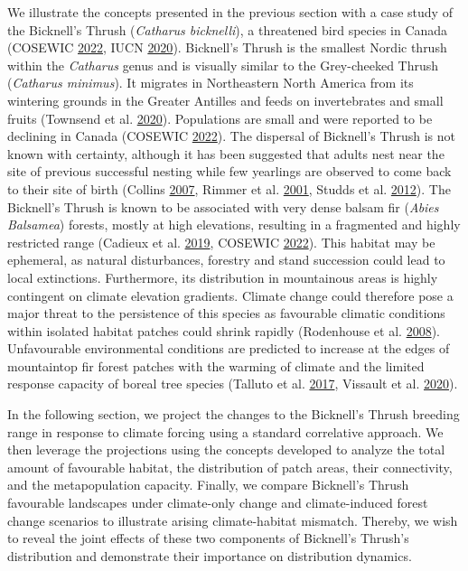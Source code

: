 \documentclass[12pt]{article}
\begin{document}
We illustrate the concepts presented in the previous section with a case
study of the Bicknell's Thrush (\emph{Catharus bicknelli}), a threatened
bird species in Canada (COSEWIC
\protect\hyperlink{ref-cosewic_cosewic_2022}{2022}, IUCN
\protect\hyperlink{ref-iucn_catharus_2020}{2020}). Bicknell's Thrush is
the smallest Nordic thrush within the \emph{Catharus} genus and is
visually similar to the Grey-cheeked Thrush (\emph{Catharus minimus}).
It migrates in Northeastern North America from its wintering grounds in
the Greater Antilles and feeds on invertebrates and small fruits
(Townsend et al.
\protect\hyperlink{ref-billerman_bicknells_2020}{2020}). Populations are
small and were reported to be declining in Canada (COSEWIC
\protect\hyperlink{ref-cosewic_cosewic_2022}{2022}). The dispersal of
Bicknell's Thrush is not known with certainty, although it has been
suggested that adults nest near the site of previous successful nesting
while few yearlings are observed to come back to their site of birth
(Collins \protect\hyperlink{ref-collins_spatial_2007}{2007}, Rimmer et
al. \protect\hyperlink{ref-rimmer_bicknells_2001}{2001}, Studds et al.
\protect\hyperlink{ref-studds_stable-hydrogen_2012}{2012}). The
Bicknell's Thrush is known to be associated with very dense balsam fir
(\emph{Abies Balsamea}) forests, mostly at high elevations, resulting in
a fragmented and highly restricted range (Cadieux et al.
\protect\hyperlink{ref-cadieux_spatially_2019}{2019}, COSEWIC
\protect\hyperlink{ref-cosewic_cosewic_2022}{2022}). This habitat may be
ephemeral, as natural disturbances, forestry and stand succession could
lead to local extinctions. Furthermore, its distribution in mountainous
areas is highly contingent on climate elevation gradients. Climate
change could therefore pose a major threat to the persistence of this
species as favourable climatic conditions within isolated habitat
patches could shrink rapidly (Rodenhouse et al.
\protect\hyperlink{ref-rodenhouse_potential_2008}{2008}). Unfavourable
environmental conditions are predicted to increase at the edges of
mountaintop fir forest patches with the warming of climate and the
limited response capacity of boreal tree species (Talluto et al.
\protect\hyperlink{ref-talluto_extinction_2017}{2017}, Vissault et al.
\protect\hyperlink{ref-vissault_slow_2020}{2020}).

In the following section, we project the changes to the Bicknell's
Thrush breeding range in response to climate forcing using a standard
correlative approach. We then leverage the projections using the
concepts developed to analyze the total amount of favourable habitat,
the distribution of patch areas, their connectivity, and the
metapopulation capacity. Finally, we compare Bicknell's Thrush
favourable landscapes under climate-only change and climate-induced
forest change scenarios to illustrate arising climate-habitat mismatch.
Thereby, we wish to reveal the joint effects of these two components of
Bicknell's Thrush's distribution and demonstrate their importance on
distribution dynamics.
\end{document}
